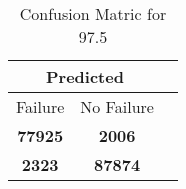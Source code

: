 \begin{table}[] 
\caption{Confusion Matric for 97.5} 
\label{Table: Prediction Accuracy-DMD97.5OnlySunEKF-ignoreReflection-Reflection} 
\centering 
\begin{tabular} 
 {@{}ccc@{}} 
\toprule 
\multicolumn{2}{c}{\textbf{Predicted}}
 \\ \midrule 
\multicolumn{1}{|c|}{Failure} & 
\multicolumn{1}{c|}{No Failure}
 \\ \midrule 
\multicolumn{1}{|c|}{\color{green}\textbf{77925}} & 
\multicolumn{1}{c|}{\color{red}\textbf{2006}}
 \\ \midrule 
\multicolumn{1}{|c|}{\color{red}\textbf{2323}} & 
\multicolumn{1}{c|}{\color{green}\textbf{87874}}
 \\ \bottomrule 
\end{tabular} 
\end{table} 
